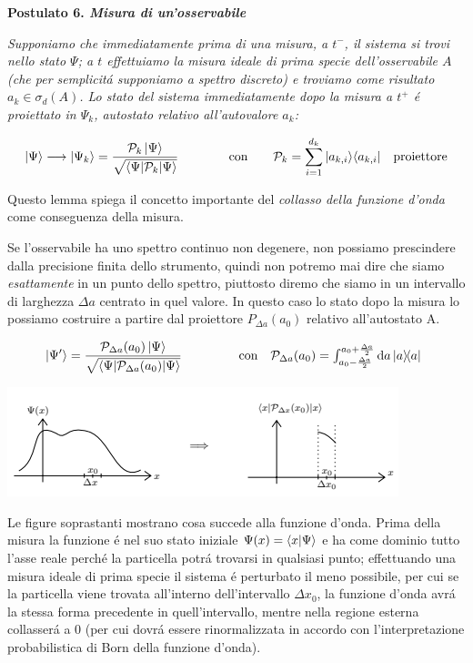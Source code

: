 \textbf{Postulato 6. \textit{Misura di un'osservabile}} 

\textit{Supponiamo che immediatamente prima di una misura, a $t^-$, il sistema si trovi nello stato $\Psi$; a $t$ effettuiamo la misura ideale di prima specie dell'osservabile $A$ (che per semplicit\'a supponiamo a spettro discreto) e troviamo come risultato $a_k \in \sigma_{d}(A)$. Lo stato del sistema immediatamente dopo la misura a $t^+$ \'e proiettato in $\Psi_k$, autostato relativo all'autovalore $a_k$:}

$$|\Psi\rangle\longrightarrow|\Psi_{k}\rangle=\frac{{\mathcal{P}}_{k}\,|\Psi\rangle}{\sqrt{\left\langle\Psi|{\mathcal{P}}_{k}|\Psi\right\rangle}} \qquad\qquad \text{con} \qquad \mathcal{P}_k = \sum_{i=1}^{d_k} \ket{a_{k,i}} \bra{a_{k,i}} \quad \text{proiettore}$$

Questo lemma spiega il concetto importante del \textit{collasso della funzione d'onda} come conseguenza della misura.

Se l'osservabile ha uno spettro continuo non degenere, non possiamo prescindere dalla precisione finita dello strumento, quindi non potremo mai dire che siamo \textit{esattamente} in un punto dello spettro, piuttosto diremo che siamo in un intervallo di larghezza $\Delta a$ centrato in quel valore. In questo caso lo stato dopo la misura lo possiamo costruire a partire dal proiettore $P_{\Delta a}(a_0)$ relativo all'autostato A.

$$\ket{\Psi^\prime} = \frac{{\mathcal{P}}_{\Delta a}(a_{0})\,|\Psi\rangle}{\sqrt{\left\langle\Psi|{\mathcal{P}}_{\Delta a}(a_{0})|\Psi\right\rangle}} \qquad\qquad \begin{array}{r l}\text{con}&{{}{\mathcal{P}}_{\Delta a}(a_{0})=\int_{a_{0}-{\frac{\Delta a}{2}}}^{a_{0}+{\frac{\Delta a}{2}}}\mathrm{d}a\,|a\rangle\!\langle a|}\end{array}$$
	
\begin{center}
	\includegraphics{immagini/19_image_2.png}
\end{center}
	
Le figure soprastanti mostrano cosa succede alla funzione d'onda. Prima della misura la funzione \'e nel suo stato iniziale $\Psi(x) = \braket{x}{\Psi}$ e ha come dominio tutto l'asse reale perch\'e la particella potr\'a trovarsi in qualsiasi punto; effettuando una misura ideale di prima specie il sistema \'e perturbato il meno possibile, per cui se la particella viene trovata all'interno dell'intervallo $\Delta x_0$, la funzione d'onda avr\'a la stessa forma precedente in quell'intervallo, mentre nella regione esterna collasser\'a a 0 (per cui dovr\'a essere rinormalizzata in accordo con l'interpretazione probabilistica di Born della funzione d'onda).
	

